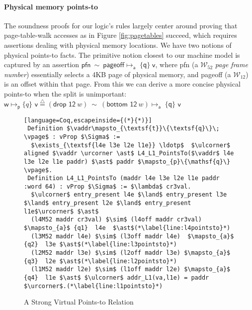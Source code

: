 \paragraph{Physical memory  points-to} The soundness proofs for our logic's rules largely center around
proving that page-table-walk accesses as in Figure \ref{fig:pagetables} succeed, which requires assertions
dealing with physical memory locations.
We have two notions of physical points-to facts. The primitive notion closest to our machine model is captured by an assertion
$ \textsf{pfn} \ \sim \ \textsf{pageoff} \mapsto_{\textsf{a}} \; \{\textsf{q}\} \; \textsf{v} $, where \textsf{pfn} (a $\mathcal{W}_{52}$ \emph{page frame number}) essentially selects a 4KB page of physical memory,
and \textsf{pageoff} (a $\mathcal{W}_{12}$) is an offset within that page.
From this we can derive a more concise physical points-to when the split is unimportant:
{$\textsf{w} \mapsto_{\textsf{p}} \{q\} \textsf{ v} \stackrel{\triangle}{=} (\textsf{drop 12}~w) \ \sim \ (\textsf{bottom 12}~w)\mapsto_{\textsf{a}} \; \{\textsf{q}\} \textsf{ v} $}

\begin{figure*}
  \begin{lstlisting}[language=Coq,escapeinside={(*}{*)}]
 Definition $\vaddr\mapsto_{\textsf{t}}\{\textsf{q}\}\; \vpage$ : vProp $\Sigma$ := 
  $\exists_{\textsf{l4e l3e l2e l1e}} \ldotp$  $\ulcorner$ aligned $\vaddr \urcorner \ast$ L4_L1_PointsTo($\vaddr$ l4e l3e l2e l1e paddr) $\ast$ paddr $\mapsto_{p}\{\mathsf{q}\} \vpage$.
 Definition L4_L1_PointsTo (maddr l4e l3e l2e l1e paddr :word 64) : vProp $\Sigma$ := $\lambda$ cr3val.
  $\ulcorner$ entry_present l4e $\land$ entry_present l3e $\land$ entry_present l2e $\land$ entry_present l1e$\urcorner$ $\ast$
  (l4M52 maddr cr3val) $\sim$ (l4off maddr cr3val) $\mapsto_{a}$ {q1}  l4e  $\ast$(*\label{line:l4pointsto}*)
  (l3M52 maddr l4e) $\sim$ (l3off maddr l4e)  $\mapsto_{a}$ {q2}  l3e $\ast$(*\label{line:l3pointsto}*) 
  (l2M52 maddr l3e) $\sim$ (l2off maddr l3e) $\mapsto_{a}$ {q3}  l2e $\ast$(*\label{line:l2pointsto}*)
  (l1M52 maddr l2e) $\sim$ (l1off maddr l2e) $\mapsto_{a}$ {q4}  l1e $\ast$ $\ulcorner$ addr_L1(va,l1e) = paddr $\urcorner$.(*\label{line:l1pointsto}*)
\end{lstlisting}
\vspace{-1em}
\caption{A Strong Virtual Points-to Relation
}
  \label{fig:strongvirtualpointsto}
\vspace{-1em}
\end{figure*}




